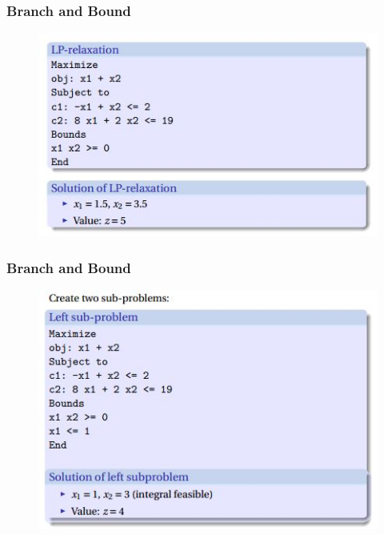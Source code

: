\documentclass{beamer}
\begin{document}
\begin{frame}
	\frametitle{Branch and Bound}
	\Large
	\begin{figure}
		\centering
		\includegraphics[width=1.1\linewidth]{BranchBound3}
	\end{figure}
	
\end{frame}
\begin{frame}
	\frametitle{Branch and Bound}
	\Large
	\begin{figure}
		\centering
		\includegraphics[width=1.1\linewidth]{BranchBound4}
	\end{figure}
	
\end{frame}
\end{document}
